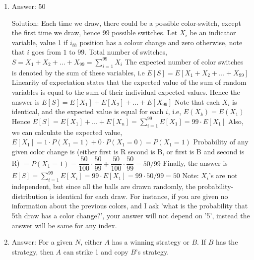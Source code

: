 \begin{enumerate}
\item
Answer: 50
 
Solution: Each time we draw, there could be a possible color-switch, except the first time we draw, hence 99 possible switches.
Let $X_i$ be an indicator variable, value 1 if $i_{th}$ position has a colour change and zero otherwise, note that $i$ goes from $1$ to $99$.
Total number of switches, $S = X_1 + X_2 + ... + X_{99} = \sum_{i=1}^{99} X_i$
The expected number of color switches is denoted by the sum of these variables, i.e $E[S] = E[X_1 + X_2 + ... + X_{99}]$
Linearity of expectation states that the expected value of the sum of random variables is equal to the sum of their individual expected values.
Hence the answer is $E[S] = E[X_1] + E[X_2] + ... + E[X_{99}]$
Note that each $X_i$ is identical, and the expected value is equal for each $i$, i.e, $E(X_k) = E(X_1) $
Hence $E[S] = E[X_1] + ... + E[X_n] = \sum_{i=1}^{99} E[X_1] = 99 \cdot E[X_1] $
Also, we can calculate the expected value, $E[X_1] = 1 \cdot P(X_1 = 1) + 0 \cdot P(X_1 = 0) = P(X_1 =1) $
Probability of any given color change is (either first is R second is B, or first is B and second is R) $= P(X_1 = 1)= \dfrac{50}{100} \cdot \dfrac{50}{99} + \dfrac{50}{100} \cdot \dfrac{50}{99} = 50/99$
Finally, the answer is $ E[S] = \sum_{i=1}^{99} E[X_i] = 99 \cdot E[X_1] = 99 \cdot 50/99 = 50$
Note:
$X_i$'s are not independent, but since all the balls are drawn randomly, the probability-distribution is identical for each draw. For instance, if you are given no information about the previous colors, and I ask 'what is the probability that 5th draw has a color change?', your answer will not depend on '5', instead the answer will be same for any index.




\item
Answer: For a given $N$, either $A$ has a winning strategy or $B$. If $B$ has the strategy, then $A$ can strike 1 and copy $B$'s strategy.
 

\end{enumerate}
